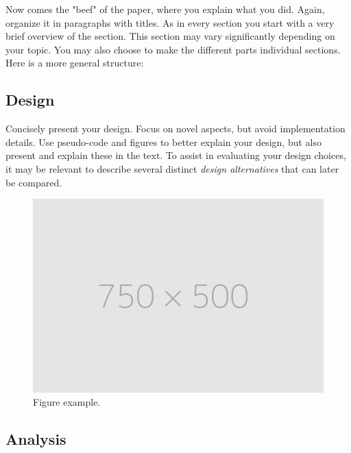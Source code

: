 Now comes the "beef" of the paper, where you explain what you did. Again, organize it in paragraphs with titles. As in every section you start with a very brief overview of the section. This section may vary significantly depending on your topic. You may also choose to make the different parts individual sections. Here is a more general structure:

\subsection{Design} \label{subsec:design}

Concisely present your design. Focus on novel aspects, but avoid implementation details. Use pseudo-code and figures to better explain your design, but also present and explain these in the text. To assist in evaluating your design choices, it may be relevant to describe several distinct \textit{design alternatives} that can later be compared.

\begin{figure}[H] %
    \centering
    \includegraphics[width=\linewidth]{Fig/placeholder.png}
    \caption{Figure example.}
    \label{fig:figure}
\end{figure}

\subsection{Analysis} \label{subsec:analysis}

